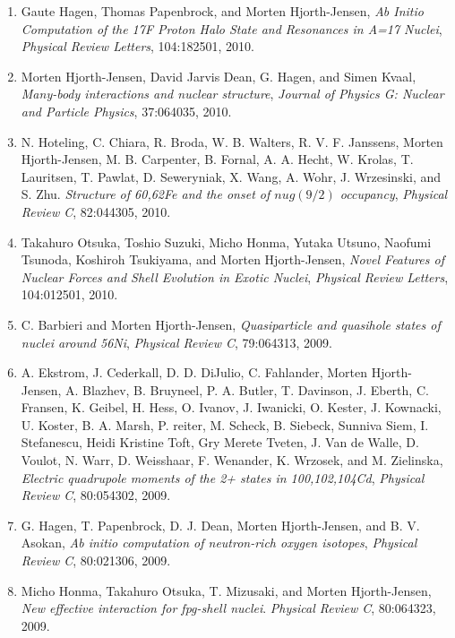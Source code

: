\documentclass[%
oneside,                 %
final,                   %
10pt]{article}
\begin{document}
\begin{enumerate}
\item Gaute Hagen, Thomas Papenbrock, and Morten Hjorth-Jensen,  \emph{Ab Initio Computation of the 17F Proton Halo State and Resonances in A=17 Nuclei},  \emph{Physical Review Letters}, 104:182501, 2010. 

\item Morten Hjorth-Jensen, David Jarvis Dean, G. Hagen, and Simen Kvaal,  \emph{Many-body interactions and nuclear structure},  \emph{Journal of Physics G: Nuclear and Particle Physics}, 37:064035,   2010. 

\item N. Hoteling, C. Chiara, R. Broda, W. B. Walters, R. V. F. Janssens, Morten   Hjorth-Jensen, M. B. Carpenter, B. Fornal, A. A. Hecht, W. Krolas,   T. Lauritsen, T. Pawlat, D. Seweryniak, X. Wang, A. Wohr, J. Wrzesinski, and   S. Zhu.  \emph{Structure of 60,62Fe and the onset of $nu g(9/2)$ occupancy},  \emph{Physical Review C}, 82:044305, 2010. 

\item Takahuro Otsuka, Toshio Suzuki, Micho Honma, Yutaka Utsuno, Naofumi Tsunoda,   Koshiroh Tsukiyama, and Morten Hjorth-Jensen,  \emph{Novel Features of Nuclear Forces and Shell Evolution in Exotic Nuclei},  \emph{Physical Review Letters}, 104:012501, 2010. 

\item C. Barbieri and Morten Hjorth-Jensen,  \emph{Quasiparticle and quasihole states of nuclei around 56Ni},  \emph{Physical Review C}, 79:064313, 2009. 

\item A. Ekstrom, J. Cederkall, D. D. DiJulio, C. Fahlander, Morten Hjorth-Jensen,   A. Blazhev, B. Bruyneel, P. A. Butler, T. Davinson, J. Eberth, C. Fransen,   K. Geibel, H. Hess, O. Ivanov, J. Iwanicki, O. Kester, J. Kownacki,   U. Koster, B. A. Marsh, P. reiter, M. Scheck, B. Siebeck, Sunniva Siem,   I. Stefanescu, Heidi Kristine Toft, Gry Merete Tveten, J. Van de Walle,   D. Voulot, N. Warr, D. Weisshaar, F. Wenander, K. Wrzosek, and M. Zielinska,  \emph{Electric quadrupole moments of the 2+ states in  100,102,104Cd},  \emph{Physical Review C}, 80:054302, 2009. 

\item G. Hagen, T. Papenbrock, D. J. Dean, Morten Hjorth-Jensen, and B. V. Asokan,  \emph{Ab initio computation of neutron-rich oxygen isotopes},  \emph{Physical Review C}, 80:021306, 2009. 

\item Micho Honma, Takahuro Otsuka, T. Mizusaki, and Morten Hjorth-Jensen,  \emph{New effective interaction for fpg-shell nuclei}.  \emph{Physical Review C}, 80:064323, 2009. 


\end{enumerate}
\end{document}
